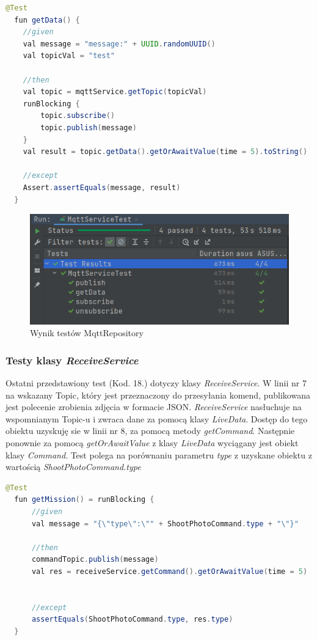 \begin{lstlisting}[language=Java, caption=Test pobierania danych za pomocą \textit{MqttService}]
  @Test
  fun getData() {
    //given
    val message = "message:" + UUID.randomUUID()
    val topicVal = "test"

    //then
    val topic = mqttService.getTopic(topicVal)
    runBlocking {
        topic.subscribe()
        topic.publish(message)
    }
    val result = topic.getData().getOrAwaitValue(time = 5).toString()

    //except
    Assert.assertEquals(message, result)
  }
\end{lstlisting}

\begin{figure}[!ht]
  \centering
  \includegraphics[width=12cm]{./Obrazy/MqttTestResult.png}
  \caption{Wynik testów MqttRepository}
  \end{figure}



\subsubsection{Testy klasy \textit{ReceiveService}}

Ostatni przedstawiony test (Kod. 18.) dotyczy klasy \textit{ReceiveService}. W linii nr 7 na wskazany Topic, który jest przeznaczony do przesyłania komend, publikowana jest polecenie zrobienia zdjęcia w formacie JSON. \textit{ReceiveService} nasłuchuje na wspomnianym Topic-u i zwraca dane za pomocą klasy \textit{LiveData}. Dostęp do tego obiektu uzyskuję sie w linii nr 8, za pomocą metody \textit{getCommand}. Następnie ponownie za pomocą \textit{getOrAwaitValue} z klasy \textit{LiveData} wyciągany jest obiekt klasy \textit{Command}. Test polega na porównaniu parametru \textit{type} z uzyskane obiektu z wartością \textit{ShootPhotoCommand.type}

\begin{lstlisting}[language=Java, caption=Test pobierania komend przez \textit{ReceiveService}]
  @Test
  fun getMission() = runBlocking {
      //given
      val message = "{\"type\":\"" + ShootPhotoCommand.type + "\"}"

      //then
      commandTopic.publish(message)
      val res = receiveService.getCommand().getOrAwaitValue(time = 5)


      //except
      assertEquals(ShootPhotoCommand.type, res.type)
  }
\end{lstlisting}

